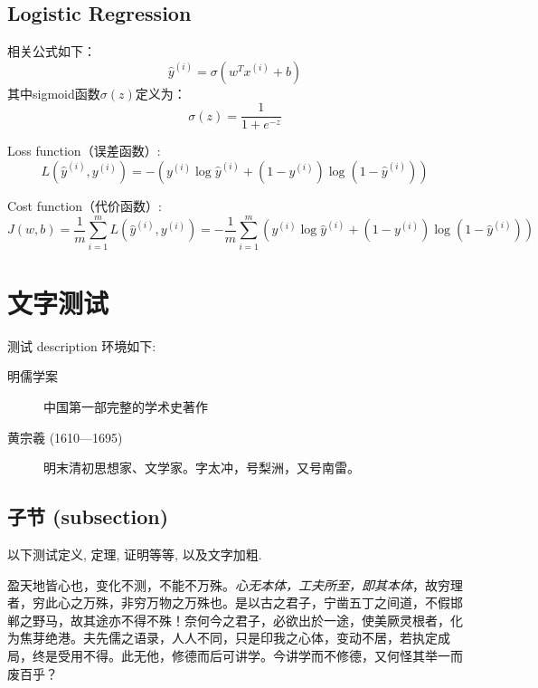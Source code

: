 	\subsection{Logistic Regression}

	相关公式如下：
	\begin{equation}
		\hat{y}^{(i)} = \sigma(w^T x^{(i)} + b) \label{eq:logistic}
	\end{equation}
	其中sigmoid函数$\sigma(z)$定义为：
	\begin{equation}
		\sigma(z) = \frac{1}{1 + e^{-z}} \label{eq:sigmoid}
	\end{equation}

	Loss function（误差函数）:
	\begin{equation}
		L(\hat{y}^{(i)}, y^{(i)}) = -(y^{(i)} \log \hat{y}^{(i)} + (1 - y^{(i)}) \log (1 - \hat{y}^{(i)})) \label{eq:loss}
	\end{equation}

	Cost function（代价函数）:
	\begin{equation}
		J(w, b) = \frac{1}{m} \sum_{i=1}^{m} L(\hat{y}^{(i)}, y^{(i)}) = -\frac{1}{m} \sum_{i=1}^{m} (y^{(i)} \log \hat{y}^{(i)} + (1 - y^{(i)}) \log (1 - \hat{y}^{(i)})) \label{eq:cost}
	\end{equation}

	\section{文字测试}\label{sec:words}

	测试 \textsf{description} 环境如下:
	\begin{description}
		\item[明儒学案] 中国第一部完整的学术史著作
		\item[黄宗羲 (1610---1695)] 明末清初思想家、文学家。字太冲，号梨洲，又号南雷。
	\end{description}
	
	\subsection{子节 (subsection)}
	以下测试定义, 定理, 证明等等, 以及文字加粗.
	
	\begin{definition}
		盈天地皆心也，变化不测，不能不万殊。\emph{心无本体，工夫所至，即其本体}，故穷理者，穷此心之万殊，非穷万物之万殊也。是以古之君子，宁凿五丁之间道，不假邯郸之野马，故其途亦不得不殊！奈何今之君子，必欲出於一途，使美厥灵根者，化为焦芽绝港。夫先儒之语录，人人不同，只是印我之心体，变动不居，若执定成局，终是受用不得。此无他，修德而后可讲学。今讲学而不修德，又何怪其举一而废百乎？
	\end{definition}

